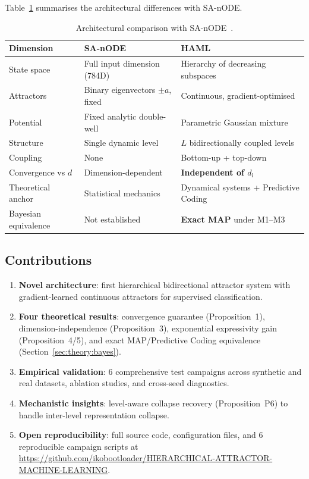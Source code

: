 \documentclass[11pt,a4paper]{article}
\begin{document}
Table~\ref{tab:comparison_sanode} summarises the architectural differences with SA-nODE.

\begin{table}[h]
\centering
\begin{tabular}{lll}
\toprule
\textbf{Dimension} & \textbf{SA-nODE} & \textbf{HAML} \\
\midrule
State space & Full input dimension (784D) & Hierarchy of decreasing subspaces \\
Attractors & Binary eigenvectors $\pm a$, fixed & Continuous, gradient-optimised \\
Potential & Fixed analytic double-well & Parametric Gaussian mixture \\
Structure & Single dynamic level & $L$ bidirectionally coupled levels \\
Coupling & None & Bottom-up + top-down \\
Convergence vs $d$ & Dimension-dependent & \textbf{Independent of $d_l$} \\
Theoretical anchor & Statistical mechanics & Dynamical systems + Predictive Coding \\
Bayesian equivalence & Not established & \textbf{Exact MAP} under M1--M3 \\
\bottomrule
\end{tabular}
\caption{Architectural comparison with SA-nODE~\cite{marino2024}.}
\label{tab:comparison_sanode}
\end{table}

\subsection{Contributions}

\begin{enumerate}
  \item \textbf{Novel architecture}: first hierarchical bidirectional attractor system with
        gradient-learned continuous attractors for supervised classification.
  \item \textbf{Four theoretical results}: convergence guarantee (Proposition~1),
        dimension-independence (Proposition~3), exponential expressivity gain
        (Proposition~4/5), and exact MAP/Predictive Coding equivalence (Section~\ref{sec:theory:bayes}).
  \item \textbf{Empirical validation}: 6 comprehensive test campaigns across synthetic and real
        datasets, ablation studies, and cross-seed diagnostics.
  \item \textbf{Mechanistic insights}: level-aware collapse recovery (Proposition~P6) to handle
        inter-level representation collapse.
  \item \textbf{Open reproducibility}: full source code, configuration files, and 6 reproducible
        campaign scripts at \url{https://github.com/ikobootloader/HIERARCHICAL-ATTRACTOR-MACHINE-LEARNING}.
\end{enumerate}
\end{document}
